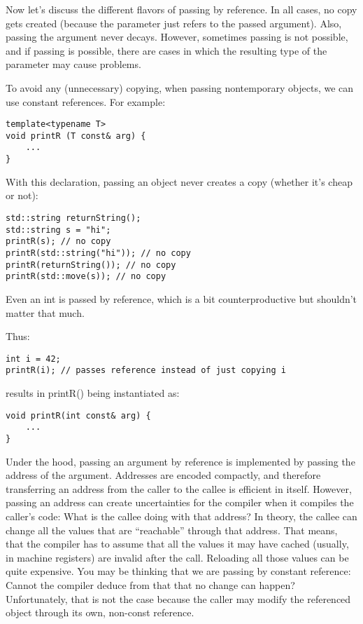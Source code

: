 
Now let’s discuss the different flavors of passing by reference. In all cases, no copy gets created (because the parameter just refers to the passed argument). Also, passing the argument never decays. However, sometimes passing is not possible, and if passing is possible, there are cases in which the resulting type of the parameter may cause problems.


To avoid any (unnecessary) copying, when passing nontemporary objects, we can use constant references. For example:

\begin{lstlisting}[style=styleCXX]
template<typename T>
void printR (T const& arg) {
	...
}
\end{lstlisting}

With this declaration, passing an object never creates a copy (whether it’s cheap or not):

\begin{lstlisting}[style=styleCXX]
std::string returnString();
std::string s = "hi";
printR(s); // no copy
printR(std::string("hi")); // no copy
printR(returnString()); // no copy
printR(std::move(s)); // no copy
\end{lstlisting}

Even an int is passed by reference, which is a bit counterproductive but shouldn’t matter that much. 

Thus:

\begin{lstlisting}[style=styleCXX]
int i = 42;
printR(i); // passes reference instead of just copying i
\end{lstlisting}

results in printR() being instantiated as:

\begin{lstlisting}[style=styleCXX]
void printR(int const& arg) {
	...
}
\end{lstlisting}

Under the hood, passing an argument by reference is implemented by passing the address of the argument. Addresses are encoded compactly, and therefore transferring an address from the caller to the callee is efficient in itself. However, passing an address can create uncertainties for the compiler when it compiles the caller’s code: What is the callee doing with that address? In theory, the callee can change all the values that are “reachable” through that address. That means, that the compiler has to assume that all the values it may have cached (usually, in machine registers) are invalid after the call. Reloading all those values can be quite expensive. You may be thinking that we are passing by constant reference: Cannot the compiler deduce from that that no change can happen? Unfortunately, that is not the case because the caller may modify the referenced object through its own, non-const reference.

